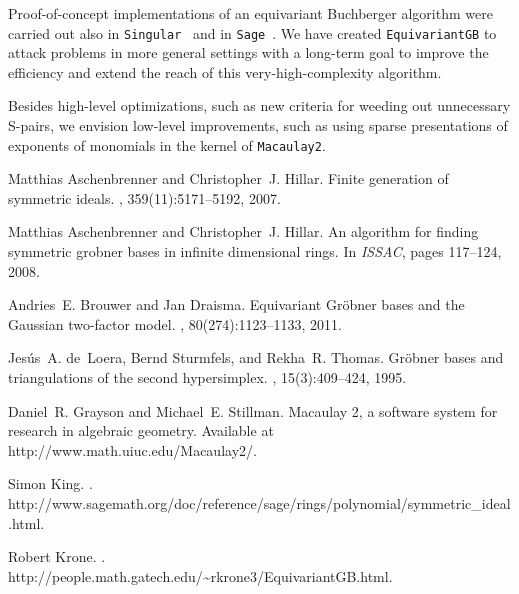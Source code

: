 \documentclass[10pt]{amsart}
\theoremstyle{definition}
\theoremstyle{remark}
\numberwithin{equation}{section}
\newcommand{\<}{\langle}
\renewcommand{\>}{\rangle}
\begin{document}
Proof-of-concept implementations of an equivariant Buchberger algorithm were carried out also in {\tt Singular}~\cite{Aschenbrenner-Hillar:ISSAC} and in {\tt Sage}~\cite{SAGE:symmetric-GB}. We have created {\tt EquivariantGB} to attack problems in more general settings with a long-term goal to improve the efficiency and extend the reach of this very-high-complexity algorithm.

Besides high-level optimizations, such as new criteria for weeding out unnecessary S-pairs, we envision low-level improvements, such as using sparse presentations of exponents of monomials in the kernel of {\tt Macaulay2}. 


%

\def\cprime{$'$}
\begin{thebibliography}{1}

Matthias Aschenbrenner and Christopher~J. Hillar.
\newblock Finite generation of symmetric ideals.
, 359(11):5171--5192, 2007.

Matthias Aschenbrenner and Christopher~J. Hillar.
\newblock An algorithm for finding symmetric grobner bases in infinite
  dimensional rings.
\newblock In {\em ISSAC}, pages 117--124, 2008.

Andries~E. Brouwer and Jan Draisma.
\newblock Equivariant {G}r\"obner bases and the {G}aussian two-factor model.
, 80(274):1123--1133, 2011.

Jes{\'u}s~A. de~Loera, Bernd Sturmfels, and Rekha~R. Thomas.
\newblock Gr\"obner bases and triangulations of the second hypersimplex.
, 15(3):409--424, 1995.

Daniel~R. Grayson and Michael~E. Stillman.
\newblock Macaulay 2, a software system for research in algebraic geometry.
\newblock Available at http://www.math.uiuc.edu/Macaulay2/.

Simon King.
.
\newblock
  \\ http://www.sagemath.org/doc/reference/sage/rings/polynomial/symmetric\_ideal%
  .html.

Robert Krone.
.
\newblock \\ http://people.math.gatech.edu/{\textasciitilde}rkrone3/EquivariantGB.html.

\end{thebibliography}
\end{document}
